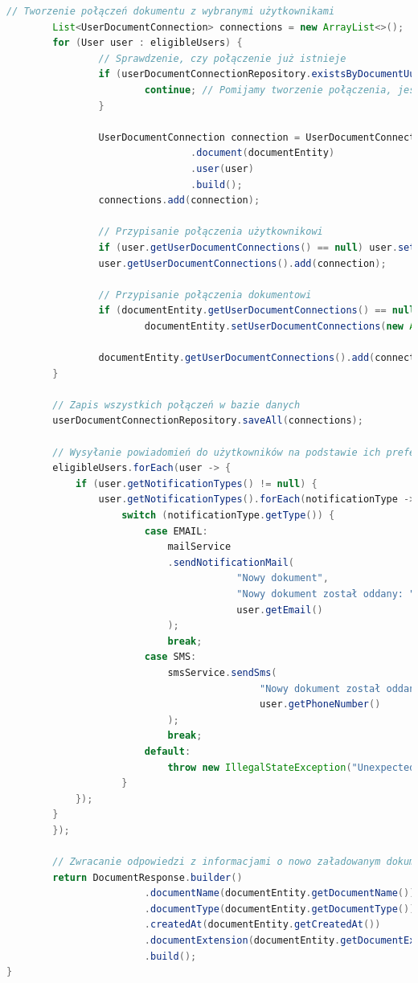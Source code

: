 \begin{lstlisting}[language=Java, style=JavaStyle, caption=Metoda dodawania dokumentu w klasie \texttt{DocumentServiceImp}]
		// Tworzenie połączeń dokumentu z wybranymi użytkownikami
		List<UserDocumentConnection> connections = new ArrayList<>();
		for (User user : eligibleUsers) {
				// Sprawdzenie, czy połączenie już istnieje
				if (userDocumentConnectionRepository.existsByDocumentUuidIDAndUserUuidID(documentEntity.getUuidID(), user.getUuidID())) {
						continue; // Pomijamy tworzenie połączenia, jeśli już istnieje
				}

				UserDocumentConnection connection = UserDocumentConnection.builder()
								.document(documentEntity)
								.user(user)
								.build();
				connections.add(connection);

				// Przypisanie połączenia użytkownikowi
				if (user.getUserDocumentConnections() == null) user.setUserDocumentConnections(new ArrayList<>());
				user.getUserDocumentConnections().add(connection);

				// Przypisanie połączenia dokumentowi
				if (documentEntity.getUserDocumentConnections() == null)
						documentEntity.setUserDocumentConnections(new ArrayList<>());

				documentEntity.getUserDocumentConnections().add(connection);
		}

		// Zapis wszystkich połączeń w bazie danych
		userDocumentConnectionRepository.saveAll(connections);

		// Wysyłanie powiadomień do użytkowników na podstawie ich preferencji
		eligibleUsers.forEach(user -> {
			if (user.getNotificationTypes() != null) {
				user.getNotificationTypes().forEach(notificationType -> {
					switch (notificationType.getType()) {
						case EMAIL:
							mailService
							.sendNotificationMail(
										"Nowy dokument",
										"Nowy dokument został oddany: " + documentEntity.getDocumentName(),
										user.getEmail()
							);
							break;
						case SMS:
							smsService.sendSms(
											"Nowy dokument został oddany: " + documentEntity.getDocumentName(),
											user.getPhoneNumber()
							);
							break;
						default:
							throw new IllegalStateException("Unexpected value: " + notificationType.getType());
					}
			});
		}
		});

		// Zwracanie odpowiedzi z informacjami o nowo załadowanym dokumencie
		return DocumentResponse.builder()
						.documentName(documentEntity.getDocumentName())
						.documentType(documentEntity.getDocumentType())
						.createdAt(documentEntity.getCreatedAt())
						.documentExtension(documentEntity.getDocumentExtension())
						.build();
}
\end{lstlisting}

